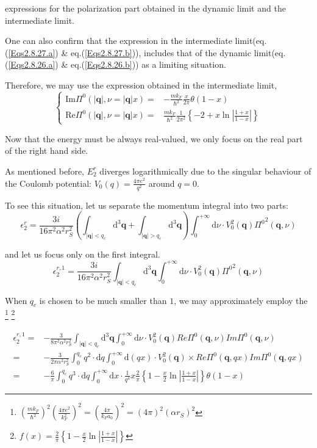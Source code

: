 expressions for the polarization part obtained in the dynamic limit and the intermediate limit.

One can also confirm that the expression in the intermediate limit(eq.(\ref{Eqs2.8.27.a}) \& eq.(\ref{Eqs2.8.27.b})), includes that of the dynamic limit(eq.(\ref{Eqs2.8.26.a}) \& eq.(\ref{Eqs2.8.26.b})) as a limiting situation.

Therefore, we may use the expression obtained in the intermediate limit,
\[\left\{ \begin{split}
\text{Im} \Pi^0(|\mathbf{q}|, \nu = |\mathbf{q}| x) =& - \frac{m k_F}{\hbar^2} \frac{x}{2\pi} \theta(1-x)\\
\text{Re} \Pi^0(|\mathbf{q}|, \nu = |\mathbf{q}| x) =& \frac{m k_F}{\hbar^2}\frac{1}{2\pi^2}\left\{ -2 + x \ln\left| \frac{1+x}{1-x} \right| \right\}
\end{split} \right.\]

Now that the energy must be always real-valued, we only focus on the real part of the right hand side.

As mentioned before, $E_2^r$ diverges logarithmically due to the singular behaviour of the Coulomb potential: $V_0(q) = \frac{4\pi e^2}{q^2}$ around $q=0$.

To see this situation, let us separate the momentum integral into two parts:
\[ \epsilon_2^r = \frac{3i}{16\pi^2 \alpha^2 r_S^2} \left( \int_{|\mathbf{q}|<q_c} \mathrm{d}^3 \mathbf{q} + \int_{|\mathbf{q}|>q_c} \mathrm{d}^3 \mathbf{q} \right) \int_0^{+\infty} \mathrm{d} \nu \cdot V_0^2(\mathbf{q}) {\Pi^0}^2(\mathbf{q},\nu) \]

and let us focus only on the first integral.
\begin{equation*} \label{Eqs2.8.9.c} \tag{2.8.9.c}
\epsilon_2^{r,1} = \frac{3i}{16\pi^2 \alpha^2 r_S^2} \int_{|\mathbf{q}|<q_c} \mathrm{d}^3 \mathbf{q} \int_0^{+\infty} \mathrm{d} \nu \cdot V_0^2(\mathbf{q}) {\Pi^0}^2(\mathbf{q},\nu)
\end{equation*}

When $q_c$ is chosen to be much smaller than $1$, we may approximately employ the
\footnote{$\left(\frac{m k_F}{\hbar^2}\right)^2\left( \frac{4\pi e^2}{k_F^2} \right)^2 = \left( \frac{4\pi}{k_F a_0} \right)^2 = (4\pi)^2(\alpha r_S)^2$}
\footnote{$f(x)=\frac{2}{\pi} \left\{ 1 - \frac{x}{2} \ln\left| \frac{1+x}{1-x} \right| \right\}$}

\[\begin{split}
\epsilon_2^{r,1} =& -\frac{3}{8\pi^2 \alpha^2 r_S^2} \int_{|\mathbf{q}|<q_c} \mathrm{d}^3 \mathbf{q} \int_0^{+\infty} \mathrm{d} \nu \cdot V_0^2(\mathbf{q}) Re\Pi^0(\mathbf{q},\nu) Im\Pi^0(\mathbf{q},\nu)\\
=&-\frac{3}{2\pi \alpha^2 r_S^2} \int_0^{q_c} q^2 \cdot \mathrm{d} q \int_0^{+\infty} \mathrm{d} (q x) \cdot V_0^2(\mathbf{q}) \times Re\Pi^0(\mathbf{q},q x) Im\Pi^0(\mathbf{q},q x)\\
=& -\frac{6}{\pi} \int_0^{q_c} q^3 \cdot \mathrm{d} q \int_0^{+\infty} \mathrm{d} x \cdot \frac{1}{q^4} x \frac{2}{\pi} \left\{ 1 - \frac{x}{2} \ln\left| \frac{1+x}{1-x} \right| \right\} \theta(1-x)
\end{split}\]

